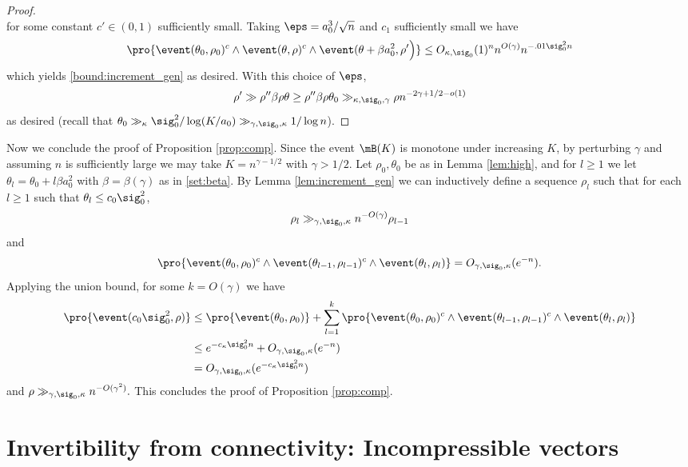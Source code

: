 \documentclass[aop,preprint]{imsart}
\theoremstyle{plain}
\theoremstyle{definition}
\theoremstyle{remark}
\numberwithin{equation}{section}
\numberwithin{theorem}{section}
\begin{document}
\begin{proof}
\[\]
for some constant $c'\in (0,1)$ sufficiently small.
Taking $\eps = a_0^3/\sqrt{n}$ and $c_1$ sufficiently small we have
\begin{equation}
\pro{ \event(\theta_0,\rho_0)^c\wedge\event(\theta,\rho)^c \wedge \event(\theta+\beta a_0^2,\rho'\Big)} \le O_{\kappa,\sig_0}(1)^n n^{O(\gamma)} n^{-.01 \sig_0^2 n}
\end{equation}
which yields \eqref{bound:increment_gen} as desired.
With this choice of $\eps$,
\[
\rho' \gg \rho'' \beta \rho \theta\ge \rho'' \beta \rho \theta_0 \gg_{\kappa,\sig_0,\gamma} \rho n^{-2\gamma + 1/2-o(1)}
\]
as desired (recall that $\theta_0\gg_\kappa \sig_0^2/\log(K/a_0) \gg_{\gamma,\sig_0,\kappa} 1/\log n$). 
\end{proof}

Now we conclude the proof of Proposition \ref{prop:comp}. 
Since the event $\mB(K)$ is monotone under increasing $K$, by perturbing $\gamma$ and assuming $n$ is sufficiently large we may take $K=n^{\gamma-1/2}$ with $\gamma>1/2$.
Let $\rho_0,\theta_0$ be as in Lemma \ref{lem:high}, and for $l\ge 1$ we let $\theta_l = \theta_0+ l\beta a_0^2$ with $\beta=\beta(\gamma)$ as in \eqref{set:beta}. 
By Lemma \ref{lem:increment_gen} we can inductively define a sequence $\rho_l$ such that for each $l\ge 1$ such that $\theta_l \le c_0\sig_0^2$, 
\[
\rho_l \gg_{\gamma,\sig_0,\kappa} n^{-O(\gamma)}\rho_{l-1}
\]
and
\[
\pro{ \event(\theta_0,\rho_0)^c\wedge \event(\theta_{l-1},\rho_{l-1})^c\wedge \event(\theta_l,\rho_l)} = O_{\gamma,\sig_0,\kappa}(e^{-n}).
\]
Applying the union bound, for some $k=O(\gamma)$ we have
\begin{align*}
\pro{ \event(c_0\sig_0^2,\rho) } 
&\le \pro{ \event(\theta_0,\rho_0)} + \sum_{l=1}^{k} 
\pro{ \event(\theta_0,\rho_0)^c\wedge \event(\theta_{l-1},\rho_{l-1})^c\wedge \event(\theta_l,\rho_l)}\\
& \le e^{-c_\kappa\sig_0^2n} + O_{\gamma,\sig_0,\kappa} (e^{-n})\\
& = O_{\gamma,\sig_0,\kappa} (e^{-c_\kappa\sig_0^2n})
\end{align*}
and 
$
\rho \gg_{\gamma,\sig_0,\kappa} n^{-O(\gamma^2)}.
$
This concludes the proof of Proposition \ref{prop:comp}.


\section{Invertibility from connectivity: Incompressible vectors}		\label{sec:incomp}
\end{document}

